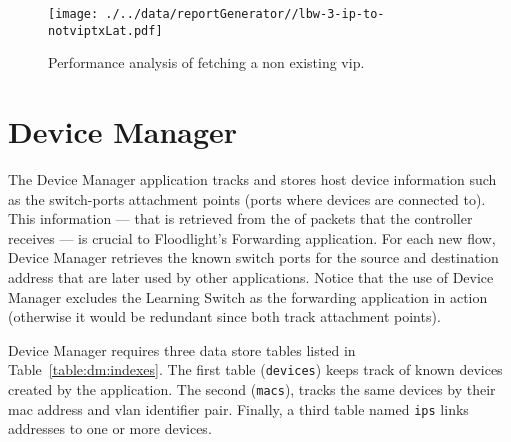 
\begin{figure}[ht]
\centering
\texttt{[image: ./../data/reportGenerator//lbw-3-ip-to-notviptxLat.pdf]}
\caption[Minimum impact of Load Balancer in the pipeline.]{Performance analysis of fetching a non existing \gls{vip}. }\label{fig:lb:minimal}
\end{figure}

\section{Device Manager}
\label{sec:feasibility:dm}
\glsresetall

The Device Manager application tracks and stores host device information such as the switch-ports attachment points (ports where devices are connected to). 
This information --- that is retrieved from the \gls{of} packets that the controller receives --- is crucial to Floodlight’s Forwarding application. 
For each new flow, Device Manager retrieves the known switch ports for the source and destination address that are later used by other applications. 
Notice that the use of  Device Manager excludes the Learning Switch as the  forwarding application in action (otherwise it would be redundant since both track attachment points).

Device Manager requires three data store tables listed in Table~\ref{table:dm:indexes}.
The first table (\texttt{devices}) keeps track of known devices created by the application.
The second (\texttt{macs}),  tracks the same devices by their \gls{mac} address and \gls{vlan} identifier pair.
Finally, a third table named \texttt{ips} links   addresses to one or more devices.


